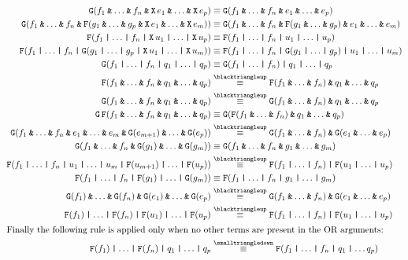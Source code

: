 \documentclass[a4paper,twoside,10pt,DIV=12]{scrreprt}
\DeclareMathOperator{\F}{\texttt{F}}
\DeclareMathOperator{\G}{\texttt{G}}
\DeclareMathOperator{\X}{\texttt{X}}
\newcommand{\OR}{\mathbin{\texttt{|}}}
\newcommand{\AND}{\mathbin{\texttt{\&}}}
\newcommand{\0}{\texttt{0}}
\newcommand{\1}{\texttt{1}}
\newcommand{\equivEU}{\stackrel{\blacktriangleup}{\equiv}}
\newcommand{\equivNeu}{\stackrel{\smalltriangledown}{\equiv}}
\begin{document}
\begin{align*}
  \G(f_1\AND\ldots\AND f_n \AND \X e_1 \AND \ldots \AND \X e_p)&\equiv \G(f_1\AND\ldots\AND f_n \AND e_1 \AND \ldots \AND e_p) \\
  \G(f_1\AND\ldots\AND f_n \AND \F (g_1 \AND \ldots \AND g_p \AND \X e_1 \AND \ldots \AND \X e_m))&\equiv \G(f_1\AND\ldots\AND f_n \AND \F(g_1 \AND \ldots \AND g_p) \AND e_1 \AND \ldots \AND e_m) \\
  \F(f_1\OR\ldots\OR f_n \OR \X u_1 \OR \ldots \OR \X u_p)&\equiv \F(f_1\OR\ldots\OR f_n \OR u_1 \OR \ldots \OR u_p) \\
  \F(f_1\OR\ldots\OR f_n \OR \G (g_1 \OR \ldots \OR g_p \OR \X u_1 \OR \ldots \OR \X u_m))&\equiv \F(f_1\OR\ldots\OR f_n \OR \G(g_1 \OR \ldots \OR g_p) \OR u_1 \OR \ldots \OR u_m) \\
  \G(f_1\OR\ldots\OR f_n \OR q_1 \OR \ldots \OR q_p)&\equiv \G(f_1\OR\ldots\OR f_n)\OR q_1 \OR \ldots \OR q_p \\
  \F(f_1\AND\ldots\AND f_n \AND q_1 \AND \ldots \AND q_p)&\equivEU \F(f_1\AND\ldots\AND f_n)\AND q_1 \AND \ldots \AND q_p \\
  \G(f_1\AND\ldots\AND f_n \AND q_1 \AND \ldots \AND q_p)&\equivEU \G(f_1\AND\ldots\AND f_n)\AND q_1 \AND \ldots \AND q_p \\
  \G\F(f_1\AND\ldots\AND f_n \AND q_1 \AND \ldots \AND q_p)&\equiv \G(\F(f_1\AND\ldots\AND f_n)\AND q_1 \AND \ldots \AND q_p) \\
  \G(f_1\AND\ldots\AND f_n \AND e_1 \AND \ldots \AND e_m \AND \G(e_{m+1}) \AND \ldots\AND \G(e_p))&\equivEU \G(f_1\AND\ldots\AND f_n)\AND \G(e_1 \AND \ldots \AND e_p) \\
  \G(f_1\AND\ldots\AND f_n \AND \G(g_1) \AND \ldots \AND \G(g_m)) &\equiv \G(f_1\AND\ldots\AND f_n\AND g_1 \AND \ldots \AND g_m) \\
  \F(f_1 \OR \ldots \OR f_n \OR u_1 \OR \ldots \OR u_m \OR \F(u_{m+1})\OR\ldots\OR \F(u_p)) &\equivEU \F(f_1\OR \ldots\OR f_n) \OR \F(u_1 \OR \ldots \OR u_p)\\
  \F(f_1 \OR \ldots \OR f_n \OR \F(g_1) \OR \ldots \OR \G(g_m)) &\equiv \F(f_1\OR \ldots\OR f_n \OR g_1 \OR \ldots \OR g_m)\\
  \G(f_1)\AND\ldots\AND \G(f_n) \AND \G(e_1) \AND \ldots\AND \G(e_p)&\equivEU \G(f_1\AND\ldots\AND f_n)\AND \G(e_1 \AND \ldots \AND e_p) \\
  \F(f_1) \OR\ldots\OR \F(f_n) \OR \F(u_1)\OR\ldots\OR \F(u_p) &\equivEU \F(f_1\OR \ldots\OR f_n) \OR \F(u_1 \OR \ldots \OR u_p)\\
\intertext{Finally the following rule is applied only when no other
    terms are present in the OR arguments:}
  \F(f_1) \OR \ldots \OR \F(f_n) \OR q_1 \OR \ldots \OR q_p &\equivNeu \F(f_1\OR \ldots \OR f_n \OR q_1\OR \ldots q_p)
\end{align*}
\end{document}
